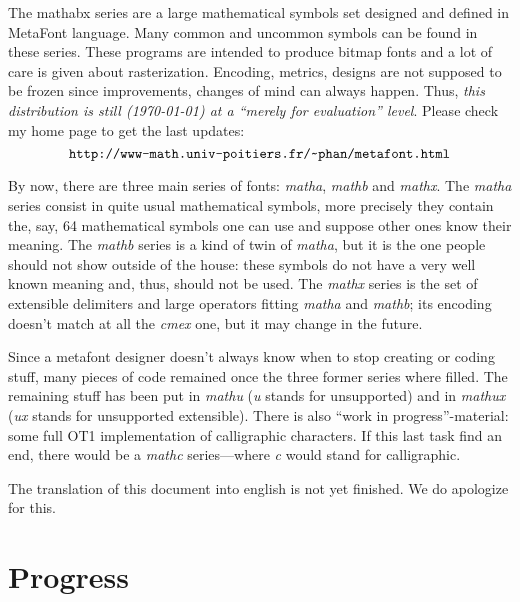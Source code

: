 \title{}
\subtitle{}
\author{}
\maketitle

The mathabx series are a large mathematical symbols set designed and
defined in MetaFont language. Many common and uncommon symbols can be
found in these series.  These programs are intended to produce bitmap
fonts and a lot of care is given about rasterization.  Encoding,
metrics, designs are not supposed to be frozen since improvements,
changes of mind can always happen.  Thus, {\it this distribution is
still (\today) at a ``merely for evaluation'' level}.  Please check my
home page to get the last updates:
$$
\hbox{\catcode`\~=12\tt http://www-math.univ-poitiers.fr/~phan/metafont.html}
$$

By now, there are three main series of fonts: {\it matha},
{\it mathb} and {\it mathx}. The {\it matha}\/
series consist in quite usual mathematical symbols, more precisely they
contain the, say, 64 mathematical symbols one can use
and suppose other ones know their meaning. The {\it  mathb}\/
series is a kind of twin of {\it  matha}, but it is the one
people should not show outside of the house: these symbols
do not have a very well known meaning and, thus, should not
be used. The {\it  mathx}\/ series is the set of extensible
delimiters and large operators fitting {\it  matha}\/ and
{\it  mathb}\/; its encoding doesn't match at all the {\it  cmex}\/
one, but it may change in the future.

Since a metafont designer doesn't always know when to stop
creating or coding stuff, many pieces of code remained once
the three former series where filled. The remaining stuff
has been put in {\it  mathu}\/ ({\it u}\/ stands for
unsupported) and in {\it  mathux}\/ ({\it ux}\/ stands for
unsupported extensible). There is also
``work in progress''-material: some full OT1 implementation
of calligraphic characters. If this last task find an end,
there would be a {\it mathc}\/ series---where {\it c}\/ would
stand for calligraphic.

The translation of this document into english is not yet finished.
We do apologize for this.
 
\section*{Progress}

